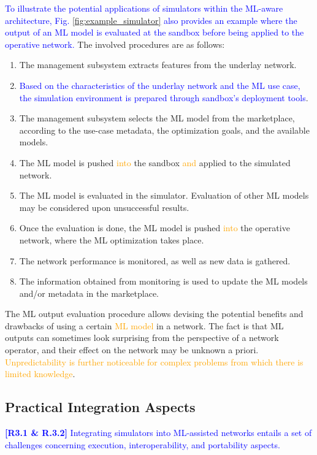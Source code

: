\documentclass[journal]{IEEEtran}
\begin{document}
	\textcolor{blue}{To illustrate the potential applications of simulators within the ML-aware architecture, Fig. \ref{fig:example_simulator} also provides an example where the output of an ML model is evaluated at the sandbox before being applied to the operative network.} The involved procedures are as follows:
	\begin{enumerate}
		\item The management subsystem extracts features from the underlay network.
		\item \textcolor{blue}{Based on the characteristics of the underlay network and the ML use case, the simulation environment is prepared through sandbox's deployment tools}.
		\item The management subsystem selects the ML model from the marketplace, according to the use-case metadata, the optimization goals, and the available models.
		\item The ML model is pushed \textcolor{orange}{into}  the sandbox \textcolor{orange}{and} applied to the simulated network.
		\item The ML model is evaluated in the simulator. Evaluation of other ML models may be considered upon unsuccessful results.
		\item Once the evaluation is done, the ML model is pushed \textcolor{orange}{into} the operative network, where the ML optimization takes place. 
		\item The network performance is monitored, as well as new data is gathered.
		\item The information obtained from monitoring is used to update the ML models and/or metadata in the marketplace.  
	\end{enumerate}

    The ML output evaluation procedure allows devising the potential benefits and drawbacks of using a certain \textcolor{orange}{ML model} in a network. The fact is that ML outputs can sometimes look surprising from the perspective of a network operator, and their effect on the network may be unknown a priori. \textcolor{orange}{Unpredictability is further noticeable for complex problems from which there is limited knowledge}.

	\subsection{Practical Integration Aspects}
		     
	\textcolor{blue}{\textbf{[R3.1 \& R.3.2]} Integrating simulators into ML-assisted networks entails a set of challenges concerning execution, interoperability, and portability aspects.}
	
\end{document}
